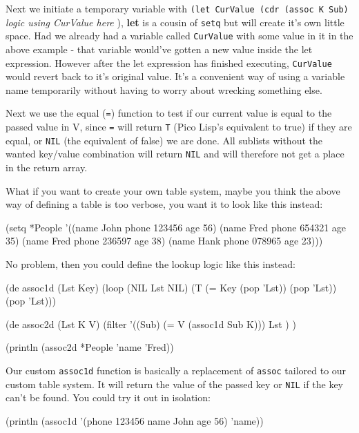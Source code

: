 Next we initiate a temporary variable with \texttt{(let CurValue (cdr
  (assoc K Sub)} \emph{logic using CurValue here} ), \textbf{let} is a
cousin of \texttt{setq} but will create it's own little space. Had we
already had a variable called \texttt{CurValue} with some value in it in the
above example - that variable would've gotten a new value inside the
let expression. However after the let expression has finished
executing, \texttt{CurValue} would revert back to it's original value. It's a
convenient way of using a variable name temporarily without having to
worry about wrecking something else.

Next we use the equal (\texttt{=}) function to test if our current
value is equal to the passed value in V, since \texttt{=} will return
\texttt{T} (Pico Lisp's equivalent to true) if they are equal, or \texttt{NIL}
(the equivalent of false) we are done. All sublists without the wanted
key/value combination will return \texttt{NIL} and will therefore not get a
place in the return array.

What if you want to create your own table system, maybe you think the
above way of defining a table is too verbose, you want it to look like
this instead:

\begin{wideverbatim}
(setq *People 
      '((name John phone 123456 age 56)
        (name Fred phone 654321 age 35)
        (name Fred phone 236597 age 38)
        (name Hank phone 078965 age 23)))
\end{wideverbatim}

No problem, then you could define the lookup logic like this instead:

\begin{wideverbatim}
(de assoc1d (Lst Key) 
    (loop
     (NIL Lst NIL)
     (T (= Key (pop 'Lst)) (pop 'Lst))
     (pop 'Lst)))

(de assoc2d (Lst K V)
    (filter '((Sub)
              (= V (assoc1d Sub K))) Lst ) )

(println (assoc2d *People 'name 'Fred))
\end{wideverbatim}

Our custom \texttt{assoc1d} function is basically a replacement of
\texttt{assoc} tailored to our custom table system. It will return the
value of the passed key or \texttt{NIL} if the key can't be found. You
could try it out in isolation:

\begin{wideverbatim}
(println (assoc1d '(phone 123456 name John age 56) 'name))
\end{wideverbatim}

